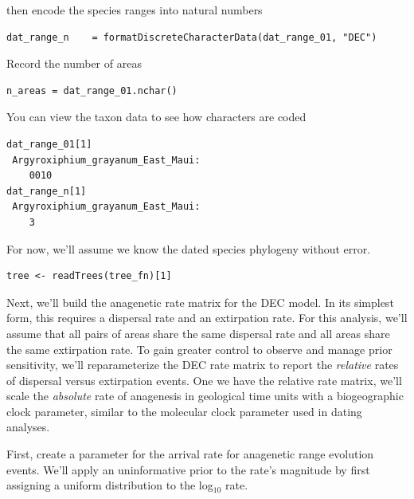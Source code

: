 then encode the species ranges into natural numbers

\begin{snugshade}
\begin{lstlisting}
dat_range_n    = formatDiscreteCharacterData(dat_range_01, "DEC")
\end{lstlisting}
\end{snugshade}


Record the number of areas

\begin{snugshade}
\begin{lstlisting}
n_areas = dat_range_01.nchar()
\end{lstlisting}
\end{snugshade}

You can view the taxon data to see how characters are coded
\begin{snugshade}
\begin{lstlisting}
dat_range_01[1]
 Argyroxiphium_grayanum_East_Maui:
    0010
dat_range_n[1]
 Argyroxiphium_grayanum_East_Maui:
    3
\end{lstlisting}
\end{snugshade}

For now, we'll assume we know the dated species phylogeny without error.

\begin{snugshade}
\begin{lstlisting}
tree <- readTrees(tree_fn)[1]
\end{lstlisting}
\end{snugshade}

Next, we'll build the anagenetic rate matrix for the DEC model.
In its simplest form, this requires a dispersal rate and an extirpation rate.
For this analysis, we'll assume that all pairs of areas share the same dispersal rate and all areas share the same extirpation rate.
To gain greater control to observe and manage prior sensitivity, we'll reparameterize the DEC rate matrix to report the {\it relative} rates of dispersal versus extirpation events.
One we have the relative rate matrix, we'll scale the {\it absolute} rate of anagenesis in geological time units with a biogeographic clock parameter, similar to the molecular clock parameter used in dating analyses.

First, create a parameter for the arrival rate for anagenetic range evolution events.
We'll apply an uninformative prior to the rate's magnitude by first assigning a uniform distribution to the log$_{10}$ rate.

